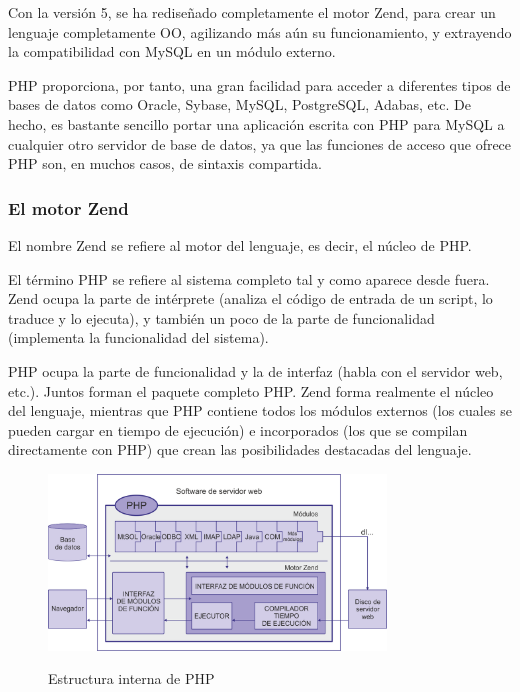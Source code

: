 Con la versión 5, se ha rediseñado completamente el motor Zend, para crear un lenguaje completamente OO, agilizando más aún su funcionamiento, y extrayendo la compatibilidad con MySQL en un módulo externo.

PHP proporciona, por tanto, una gran facilidad para acceder a diferentes tipos de bases de datos como Oracle, Sybase, MySQL, PostgreSQL, Adabas, etc. De hecho, es bastante sencillo portar una aplicación escrita con PHP para MySQL
a cualquier otro servidor de base de datos, ya que las funciones de acceso que ofrece PHP son, en muchos casos, de sintaxis compartida.

\subsubsection{El motor Zend}
El nombre Zend se refiere al motor del lenguaje, es decir, el núcleo de PHP.

El término PHP se refiere al sistema completo tal y como aparece desde fuera. Zend ocupa la parte de intérprete (analiza el código de entrada de un script, lo traduce y lo ejecuta), y también un poco de la parte de funcionalidad (implementa la funcionalidad del sistema). 

PHP ocupa la parte de funcionalidad y la de interfaz (habla con el servidor web, etc.). Juntos forman el paquete completo PHP. Zend forma realmente el núcleo del lenguaje, mientras que PHP contiene todos los módulos externos (los cuales se pueden cargar en tiempo de ejecución) e incorporados (los que se compilan directamente con PHP) que crean las posibilidades destacadas del lenguaje.

\begin{figure}[htp]
    \centering
    \includegraphics[width=0.8\textwidth]{imagenes/estructura_php.png}
    \label{fig:estructuraphp}
    \caption{Estructura interna de PHP}
\end{figure}



